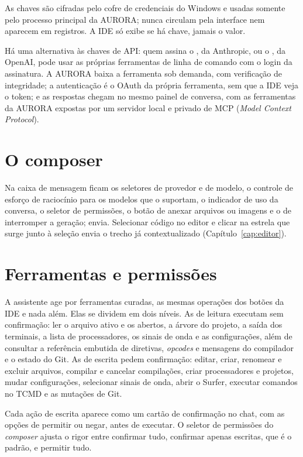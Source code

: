\begin{nota}
As chaves são cifradas pelo cofre de credenciais do Windows e usadas somente pelo processo principal da AURORA; nunca circulam pela interface nem aparecem em registros. A IDE só exibe se há chave, jamais o valor.
\end{nota}

Há uma alternativa às chaves de API: quem assina o , da Anthropic, ou o , da OpenAI, pode usar as próprias ferramentas de linha de comando com o login da assinatura. A AURORA baixa a ferramenta sob demanda, com verificação de integridade; a autenticação é o OAuth da própria ferramenta, sem que a IDE veja o token; e as respostas chegam no mesmo painel de conversa, com as ferramentas da AURORA expostas por um servidor local e privado de MCP (\textit{Model Context Protocol}).

\section{O composer}

Na caixa de mensagem ficam os seletores de provedor e de modelo, o controle de esforço de raciocínio para os modelos que o suportam, o indicador de uso da conversa, o seletor de permissões, o botão de anexar arquivos ou imagens e o de interromper a geração;  envia. Selecionar código no editor e clicar na estrela que surge junto à seleção envia o trecho já contextualizado (Capítulo~\ref{cap:editor}).

\section{Ferramentas e permissões}
\label{sec:ai-tools}

A assistente age por ferramentas curadas, as mesmas operações dos botões da IDE e nada além. Elas se dividem em dois níveis. As de leitura executam sem confirmação: ler o arquivo ativo e os abertos, a árvore do projeto, a saída dos terminais, a lista de processadores, os sinais de onda e as configurações, além de consultar a referência embutida de diretivas, \textit{opcodes} e mensagens do compilador e o estado do Git. As de escrita pedem confirmação: editar, criar, renomear e excluir arquivos, compilar e cancelar compilações, criar processadores e projetos, mudar configurações, selecionar sinais de onda, abrir o Surfer, executar comandos no TCMD e as mutações de Git.

Cada ação de escrita aparece como um cartão de confirmação no chat, com as opções de permitir ou negar, antes de executar. O seletor de permissões do \textit{composer} ajusta o rigor entre confirmar tudo, confirmar apenas escritas, que é o padrão, e permitir tudo.

